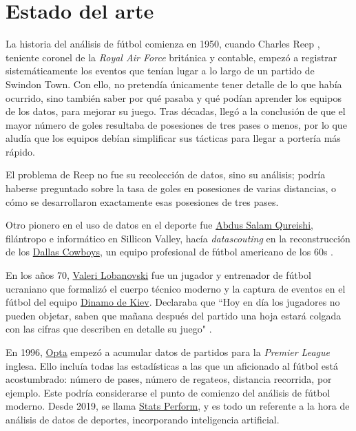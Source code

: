 \chapter{Estado del arte}
La historia del análisis de fútbol comienza en 1950, cuando Charles Reep \cite{reep-bio}, teniente coronel de 
la \textit{Royal Air Force} británica y contable, empezó a 
registrar sistemáticamente los eventos que tenían lugar a lo largo de un partido de Swindon Town. Con ello, no pretendía 
únicamente tener detalle de lo que había ocurrido, sino también saber por qué pasaba y qué podían aprender los 
equipos de los datos, para mejorar su juego. Tras décadas, llegó a la conclusión de que el mayor número 
de goles resultaba de posesiones de tres pases o menos, por lo que aludía que los equipos debían simplificar 
sus tácticas para llegar a portería más rápido.

El problema de Reep no fue su recolección de datos, sino su análisis; podría haberse preguntado sobre 
la tasa de goles en posesiones de varias distancias, o cómo se desarrollaron exactamente esas 
posesiones de tres pases. 

Otro pionero en el uso de datos en el deporte fue \href{http://www.riazhaq.com/2022/08/remembering-salam-qureishi-pillar-of.html}{Abdus Salam Qureishi}, 
filántropo e informático en Sillicon Valley, hacía \textit{datascouting} en la reconstrucción de los 
\href{https://www.dallascowboys.com/}{Dallas Cowboys}, un equipo profesional de fútbol americano de los 60s \cite{chazan2020sports}.

En los años 70, \href{https://es.wikipedia.org/wiki/Valeri_Lobanovski}{Valeri Lobanovski} fue un jugador y entrenador de 
fútbol ucraniano que formalizó el cuerpo técnico moderno y la captura de eventos en el fútbol del equipo \href{https://es.wikipedia.org/wiki/F._C._Dinamo_de_Kiev}{Dinamo de 
Kiev}. Declaraba que ``Hoy en día los jugadores no pueden objetar, saben que mañana después del partido una hoja estará colgada con 
las cifras que describen en detalle su juego" \cite{kilpatrick2011inverting}.

En 1996, \href{https://es.wikipedia.org/wiki/Opta_Sports}{Opta} empezó a acumular datos de partidos para la 
\textit{Premier League} inglesa. Ello incluía todas las estadísticas a las que un aficionado al fútbol está 
acostumbrado: número de pases, número de regateos, distancia recorrida, por ejemplo. Este podría considerarse 
el punto de comienzo del análisis de fútbol moderno. Desde 2019, se llama \href{https://www.statsperform.com/}{Stats Perform}, y 
es todo un referente a la hora de análisis de datos de deportes, incorporando inteligencia artificial.

